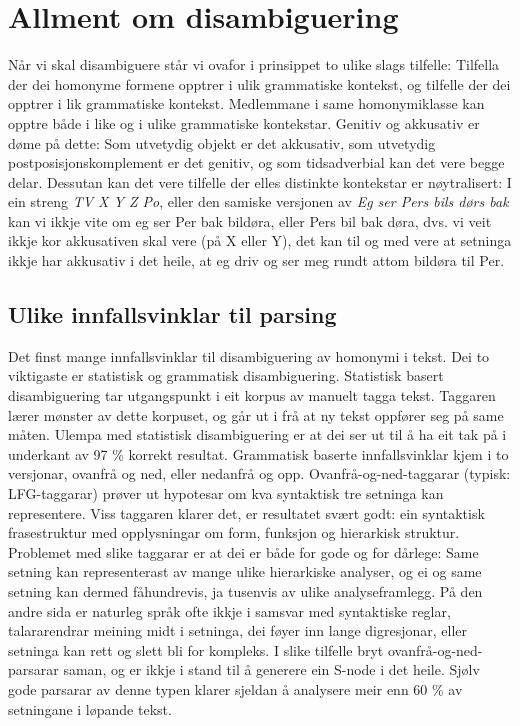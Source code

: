 \documentclass[a4paper,nynorsk]{article}
\begin{document}
\section{Allment om disambiguering}

Når vi skal disambiguere står vi ovafor i prinsippet to ulike slags tilfelle: Tilfella der dei homonyme formene opptrer i ulik grammatiske kontekst, og tilfelle der dei opptrer i lik grammatiske kontekst. Medlemmane i same homonymiklasse kan opptre både i like og i ulike grammatiske kontekstar. Genitiv og akkusativ er døme på dette: Som utvetydig objekt er det akkusativ, som utvetydig postposisjonskomplement er det genitiv, og som tidsadverbial kan det vere begge delar. Dessutan kan det vere tilfelle der elles distinkte kontekstar er nøytralisert: I ein streng \textit{TV X Y Z Po}, eller den samiske versjonen av \textit{Eg ser Pers bils dørs bak} kan vi ikkje vite om eg ser Per bak bildøra, eller Pers bil bak døra, dvs. vi veit ikkje kor akkusativen skal vere (på X eller Y), det kan til og med vere at setninga ikkje har akkusativ i det heile, at eg driv og ser meg rundt attom bildøra til Per.%


\subsection{Ulike innfallsvinklar til parsing}

Det finst mange innfallsvinklar til disambiguering av homonymi i tekst. Dei to viktigaste er statistisk og grammatisk disambiguering. Statistisk basert disambiguering tar utgangspunkt i eit korpus av manuelt tagga tekst. Taggaren lærer mønster av dette korpuset, og går ut i frå at ny tekst oppfører seg på same måten. Ulempa med statistisk disambiguering er at dei ser ut til å ha eit tak på i underkant av 97 \% korrekt resultat.  Grammatisk baserte innfallsvinklar kjem i to versjonar, ovanfrå og ned, eller nedanfrå og opp. Ovanfrå-og-ned-taggarar (typisk: LFG-taggarar) prøver ut hypotesar om kva syntaktisk tre setninga kan representere. Viss taggaren klarer det, er resultatet svært godt: ein syntaktisk frasestruktur med opplysningar om form, funksjon og hierarkisk struktur. Problemet med slike taggarar er at dei er både for gode og for dårlege: Same setning kan representerast av mange ulike hierarkiske analyser, og ei og same setning kan dermed fåhundrevis, ja tusenvis av ulike analyseframlegg. På den andre sida er naturleg språk ofte ikkje i samsvar med syntaktiske reglar, talararendrar meining midt i setninga, dei føyer inn lange digresjonar, eller setninga kan rett og slett bli for kompleks. I slike tilfelle bryt ovanfrå-og-ned-parsarar saman, og er ikkje i stand til å generere ein S-node i det heile. Sjølv gode parsarar av denne typen klarer sjeldan å analysere meir enn 60 \% av setningane i løpande tekst.%
\end{document}
